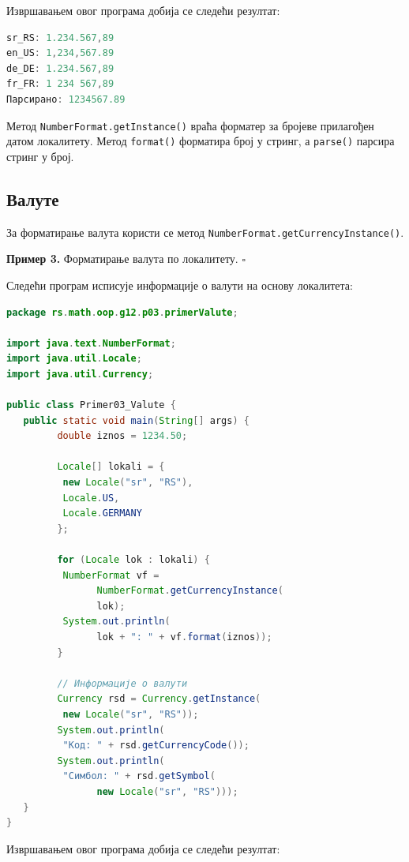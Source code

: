 Извршавањем овог програма добија се следећи резултат:


\begin{lstlisting}[language=Java]
sr_RS: 1.234.567,89
en_US: 1,234,567.89
de_DE: 1.234.567,89
fr_FR: 1 234 567,89
Парсирано: 1234567.89
\end{lstlisting}


Метод \texttt{NumberFormat.getInstance()} враћа форматер за бројеве прилагођен датом локалитету. Метод \texttt{format()} форматира број у стринг, а \texttt{parse()} парсира стринг у број.


\subsection{Валуте}

За форматирање валута користи се метод \texttt{NumberFormat.getCurrencyInstance()}.

\bigskip

\noindent \textbf{Пример 3.} Форматирање валута по локалитету. $\square$

\medskip

Следећи програм исписује информације о валути на основу локалитета:


\begin{lstlisting}[language=Java]
package rs.math.oop.g12.p03.primerValute;
 
import java.text.NumberFormat;
import java.util.Locale;
import java.util.Currency;
 
public class Primer03_Valute {
   public static void main(String[] args) {
         double iznos = 1234.50;
 
         Locale[] lokali = {
          new Locale("sr", "RS"),
          Locale.US,
          Locale.GERMANY
         };
 
         for (Locale lok : lokali) {
          NumberFormat vf =
                NumberFormat.getCurrencyInstance(
                lok);
          System.out.println(
                lok + ": " + vf.format(iznos));
         }
 
         // Информације о валути
         Currency rsd = Currency.getInstance(
          new Locale("sr", "RS"));
         System.out.println(
          "Код: " + rsd.getCurrencyCode());
         System.out.println(
          "Симбол: " + rsd.getSymbol(
                new Locale("sr", "RS")));
   }
}
\end{lstlisting}


Извршавањем овог програма добија се следећи резултат:


